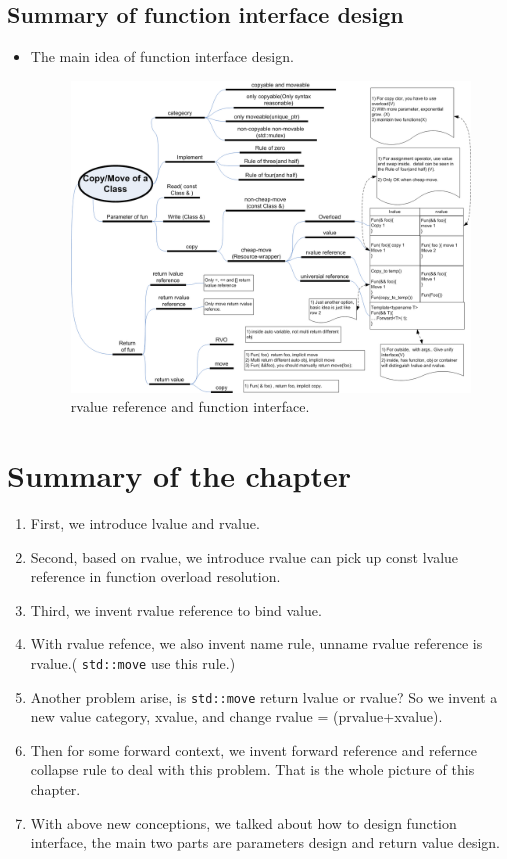 \documentclass[a4paper,11pt,twoside]{book}
\begin{document}
\subsection{Summary of function interface design}
\begin{itemize}
		\item The main idea of function interface design.
	\begin{figure}[h]
	\centering
	\includegraphics[width=1.0\linewidth]{pics/move.png}
	\caption{rvalue reference and function interface.}
	\label{fig:rvalueref}
	\end{figure}

\end{itemize}

\section{Summary of the chapter}
\begin{enumerate}
		\item First, we introduce lvalue and rvalue.
		\item Second, based on rvalue, we introduce rvalue can pick up const lvalue reference in function overload resolution. 
		\item Third, we invent rvalue reference to bind value.
		\item With rvalue refence, we also invent name rule, unname rvalue reference is rvalue.( \texttt{std::move} use this rule.) 
		\item Another problem arise, is \texttt{std::move} return lvalue or rvalue? So we invent a new value category, xvalue, and change rvalue = (prvalue+xvalue).

		\item Then for some forward context, we invent forward reference and refernce collapse rule to deal with this problem. That is the whole picture of this chapter.
				
		\item With above new conceptions, we talked about how to design function interface, the main two parts are parameters design and return value design. 
\end{enumerate}
\end{document}
